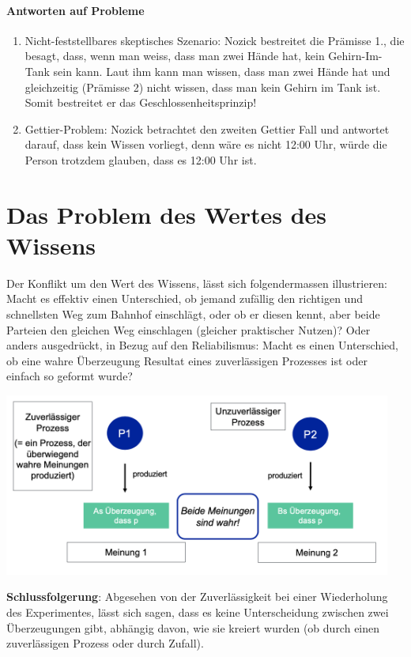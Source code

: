 \documentclass[../main.tex]{subfiles}
\begin{document}
\paragraph{Antworten auf Probleme}
\begin{enumerate}
	\item Nicht-feststellbares skeptisches Szenario: Nozick bestreitet die Prämisse 1., die besagt, dass, wenn man weiss, dass man zwei Hände hat, kein Gehirn-Im-Tank sein kann. Laut ihm kann man wissen, dass man zwei Hände hat und gleichzeitig (Prämisse 2) nicht wissen, dass man kein Gehirn im Tank ist. Somit bestreitet er das Geschlossenheitsprinzip!
	\item Gettier-Problem: Nozick betrachtet den zweiten Gettier Fall und antwortet darauf, dass kein Wissen vorliegt, denn wäre es nicht 12:00 Uhr, würde die Person trotzdem glauben, dass es 12:00 Uhr ist. 
\end{enumerate}

\section{Das Problem des Wertes des Wissens}
Der Konflikt um den Wert des Wissens, lässt sich folgendermassen illustrieren: Macht es effektiv einen Unterschied, ob jemand zufällig den richtigen und schnellsten Weg zum Bahnhof einschlägt, oder ob er diesen kennt, aber beide Parteien den gleichen Weg einschlagen (gleicher praktischer Nutzen)? Oder anders ausgedrückt, in Bezug auf den Reliabilismus: Macht es einen Unterschied, ob eine wahre Überzeugung Resultat eines zuverlässigen Prozesses ist oder einfach so geformt wurde?

{\centering\includegraphics[height=6cm]{images/wahre_ueberzeugungen_und_zufaellige_ueberzeugungen.png}\endcenter}

\textbf{Schlussfolgerung}: Abgesehen von der Zuverlässigkeit bei einer Wiederholung des Experimentes, lässt sich sagen, dass es keine Unterscheidung zwischen zwei Überzeugungen gibt, abhängig davon, wie sie kreiert wurden (ob durch einen zuverlässigen Prozess oder durch Zufall).
\end{document}
